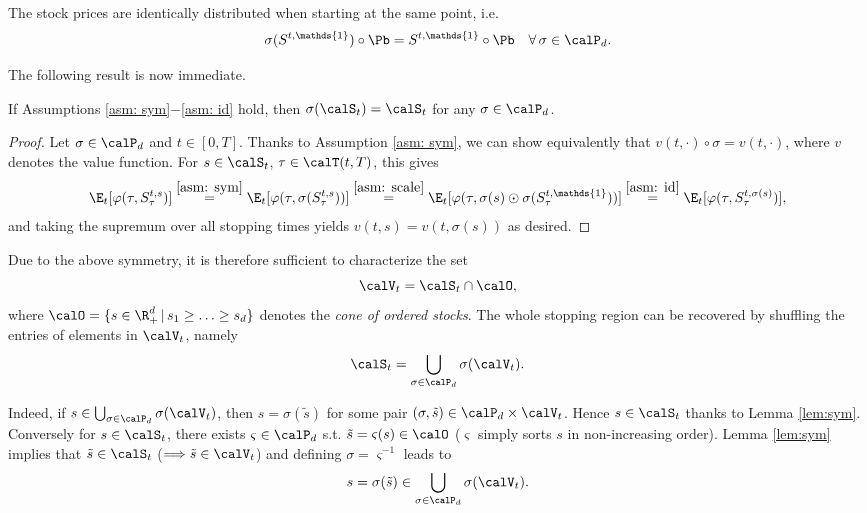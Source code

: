 \begin{asm}\label{asm: id}
    The stock prices are identically distributed when starting at the same point, i.e. 
    $$ \sigma(S^{t,\mathds{1}})  \circ \Pb = S^{t,\mathds{1}}  \circ \Pb \quad \forall \,\sigma \in \calP_d.$$
\end{asm}


The following result is now immediate.
\begin{lemma}\label{lem:sym}
If Assumptions \ref{asm: sym}$-$\ref{asm: id} hold, then 
$\sigma(\calS_t)= \calS_t$ for any $\sigma \in \calP_d$.
\end{lemma}
\begin{proof} Let $\sigma \in \calP_d$ and $t \in [0,T]$. Thanks to Assumption \ref{asm: sym}, we can show equivalently that $v(t,\cdot) \circ \sigma =v(t,\cdot)$, where $v$ denotes the value function. 
For $s \in \calS_t$, $\tau \in \calT(t,T)$, this gives
\begin{align*}
    \E_t[\varphi(\tau,S^{t,s}_\tau)] \overset{\ref{asm: sym}}{=} \E_t[\varphi(\tau,\sigma(S^{t,s}_\tau))]
    \overset{\ref{asm: scale}}{=} \E_t[\varphi(\tau,  \sigma(s) \odot \sigma(S^{t,\mathds{1}}_\tau))]
    \overset{\ref{asm: id}}{=} \E_t[\varphi(\tau,S^{t,\sigma(s)}_\tau)],
\end{align*}
and taking the supremum over all stopping times yields $v(t,s)=v(t,\sigma(s))$ as desired.
\end{proof}

Due to the above symmetry, it is therefore sufficient to characterize the set $$\calV_t= \calS_t \cap \calO,$$ where $\calO = \{s\in \R_+^d \,|\, s_1 \geq \ldots \geq s_d\}$ denotes the \textit{cone of ordered stocks}. The whole stopping region can be recovered by shuffling the entries of  elements in $\calV_t$, namely
\begin{equation}\label{eq: recoverS}
    \calS_t = \bigcup_{\sigma \in \calP_d} \sigma(\calV_t). 
\end{equation}

Indeed, if $s\in  \bigcup_{\sigma \in \calP_d} \sigma(\calV_t)$, then $s=\sigma(\tilde{s})$ for some pair $(\sigma,\tilde{s}) \in \calP_d \times \calV_t$. Hence 
$s \in \calS_t$ thanks to Lemma \ref{lem:sym}. Conversely for $s\in \calS_t$, there exists $\varsigma \in \calP_d $ s.t. $\tilde{s}=\varsigma(s) \in \calO$ ($\varsigma$ simply sorts  $s$ in non-increasing order). Lemma \ref{lem:sym} implies that $\tilde{s} \in \calS_t$ ($\Longrightarrow \tilde{s} \in \calV_t$) and defining $ \sigma=\varsigma^{-1}$ leads to
$$s = \sigma (\tilde{s}) \in \bigcup_{\sigma \in \calP_d} \sigma(\calV_t). $$

